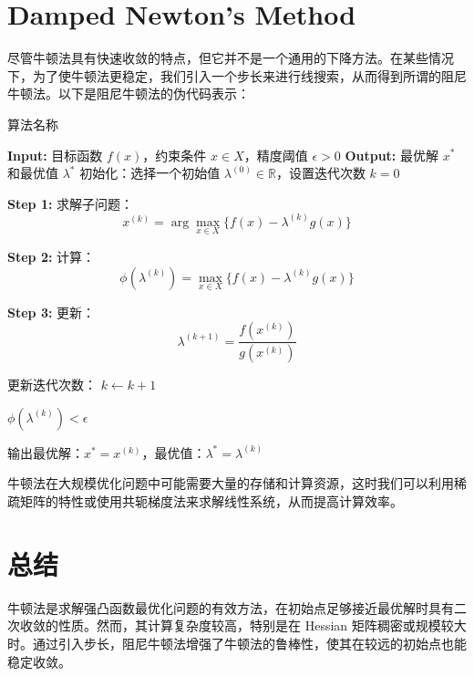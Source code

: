 	\section{Damped Newton's Method}
	尽管牛顿法具有快速收敛的特点，但它并不是一个通用的下降方法。在某些情况下，为了使牛顿法更稳定，我们引入一个步长来进行线搜索，从而得到所谓的阻尼牛顿法。以下是阻尼牛顿法的伪代码表示：
	\begin{myalgorithm}
	\begin{algorithm}[H]
			\caption{算法名称}
		\begin{algorithmic}[1]
			\State \textbf{Input:} 目标函数 \( f(x) \)，约束条件 \( x \in X \)，精度阈值 \( \epsilon > 0 \)
			\State \textbf{Output:} 最优解 \( x^* \) 和最优值 \( \lambda^* \)
			\State 初始化：选择一个初始值 \( \lambda^{(0)} \in \mathbb{R} \)，设置迭代次数 \( k = 0 \)
			
			\Repeat
			\State \textbf{Step 1:} 求解子问题：
			\[
			x^{(k)} = \arg \max_{x \in X} \bigl\{ f(x) - \lambda^{(k)} g(x) \bigr\}
			\]
			
			\State \textbf{Step 2:} 计算：
			\[
			\phi(\lambda^{(k)}) = \max_{x \in X} \bigl\{ f(x) - \lambda^{(k)} g(x) \bigr\}
			\]
			
			\State \textbf{Step 3:} 更新：
			\[
			\lambda^{(k+1)} = \frac{f(x^{(k)})}{g(x^{(k)})}
			\]
			
			\State 更新迭代次数： \( k \gets k + 1 \)
			
			\Until \( \phi(\lambda^{(k)}) < \epsilon \)
			
			\State 输出最优解：\( x^* = x^{(k)} \)，最优值：\( \lambda^* = \lambda^{(k)} \)
		\end{algorithmic}
		\end{algorithm}
		\end{myalgorithm}

	\begin{myremark}
		牛顿法在大规模优化问题中可能需要大量的存储和计算资源，这时我们可以利用稀疏矩阵的特性或使用共轭梯度法来求解线性系统，从而提高计算效率。
	\end{myremark}
	\section{总结}
	\begin{tcolorbox}[colback=yellow!5!white, colframe=yellow!75!black, title=总结]
		牛顿法是求解强凸函数最优化问题的有效方法，在初始点足够接近最优解时具有二次收敛的性质。然而，其计算复杂度较高，特别是在 Hessian 矩阵稠密或规模较大时。通过引入步长，阻尼牛顿法增强了牛顿法的鲁棒性，使其在较远的初始点也能稳定收敛。\end{tcolorbox}





